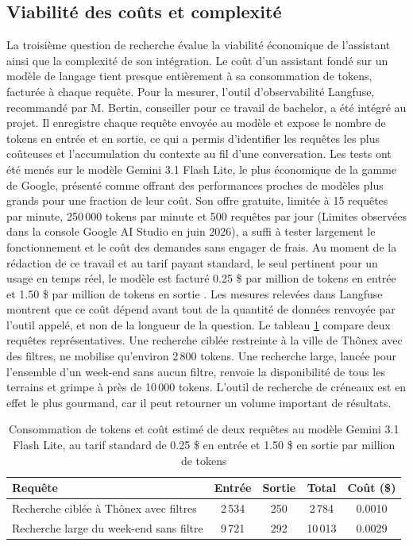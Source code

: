 \documentclass[12pt]{article}
\begin{document}
\subsection{Viabilité des coûts et complexité}
La troisième question de recherche évalue la viabilité économique de l'assistant ainsi que la complexité de son intégration. Le coût d'un assistant fondé sur un modèle de langage tient presque entièrement à sa consommation de tokens, facturée à chaque requête. Pour la mesurer, l'outil d'observabilité Langfuse, recommandé par M. Bertin, conseiller pour ce travail de bachelor, a été intégré au projet. Il enregistre chaque requête envoyée au modèle et expose le nombre de tokens en entrée et en sortie, ce qui a permis d'identifier les requêtes les plus coûteuses et l'accumulation du contexte au fil d'une conversation.
\newline\newline
Les tests ont été menés sur le modèle Gemini 3.1 Flash Lite, le plus économique de la gamme de Google, présenté comme offrant des performances proches de modèles plus grands pour une fraction de leur coût. Son offre gratuite, limitée à 15 requêtes par minute, 250\,000 tokens par minute et 500 requêtes par jour (Limites observées dans la console Google AI Studio en juin 2026), a suffi à tester largement le fonctionnement et le coût des demandes sans engager de frais. Au moment de la rédaction de ce travail et au tarif payant standard, le seul pertinent pour un usage en temps réel, le modèle est facturé 0.25 \$ par million de tokens en entrée et 1.50 \$ par million de tokens en sortie \parencite{google_gemini_2026}.
\newline\newline
Les mesures relevées dans Langfuse montrent que ce coût dépend avant tout de la quantité de données renvoyée par l'outil appelé, et non de la longueur de la question. Le tableau \ref{tab:cout_tokens} compare deux requêtes représentatives. Une recherche ciblée restreinte à la ville de Thônex avec des filtres, ne mobilise qu'environ 2\,800 tokens. Une recherche large, lancée pour l'ensemble d'un week-end sans aucun filtre, renvoie la disponibilité de tous les terrains et grimpe à près de 10\,000 tokens. L'outil de recherche de créneaux est en effet le plus gourmand, car il peut retourner un volume important de résultats.
\vspace{0.5cm}
\begin{table}[H]
    \centering
    \begin{tabularx}{\textwidth}{|X|c|c|c|c|}
    \hline
    \rowcolor[gray]{0.9}
    \textbf{Requête} & \textbf{Entrée} & \textbf{Sortie} & \textbf{Total} & \textbf{Coût (\$)} \\ \hline
    Recherche ciblée à Thônex avec filtres & 2\,534 & 250 & 2\,784 & 0.0010 \\ \hline
    Recherche large du week-end sans filtre & 9\,721 & 292 & 10\,013 & 0.0029 \\ \hline
    \end{tabularx}
    \caption{Consommation de tokens et coût estimé de deux requêtes au modèle Gemini 3.1 Flash Lite, au tarif standard de 0.25 \$ en entrée et 1.50 \$ en sortie par million de tokens}
    \label{tab:cout_tokens}
\end{table}
\end{document}
